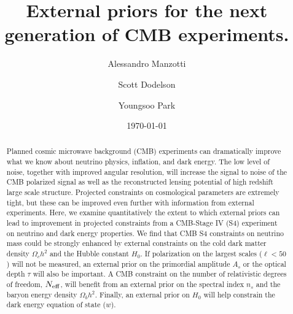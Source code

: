\documentclass[aps,prd,reprint,superscriptaddress]{revtex4-1}
\begin{document}
\graphicspath{{images/}}

\title{External priors for the next generation of CMB experiments.}
\author{Alessandro Manzotti}
\author{Scott Dodelson}


\author{Youngsoo Park}


\date{\today}
\begin{abstract}
Planned cosmic microwave background (CMB) experiments can dramatically improve what we know about neutrino physics, inflation, and dark energy. 
The low level of noise, together with improved angular resolution, will increase the signal to noise of the CMB polarized signal as well as the reconstructed lensing potential of high redshift large scale structure. Projected constraints on cosmological parameters are extremely tight, but these can be improved even further with information from external experiments. Here, we examine quantitatively the extent to which external priors can lead to improvement in projected constraints from a CMB-Stage IV (S4) experiment on neutrino and dark energy properties.
We find that CMB S4 constraints on neutrino mass could be strongly enhanced by external constraints on the cold dark matter density $\Omega_{c}h^{2}$ and the Hubble constant $H_{0}$. If polarization on the largest scales ($\ell<50$) will not be measured, an external prior on the primordial amplitude $A_{s}$ or the optical depth $\tau$ will also be important. A CMB constraint on the number of relativistic degrees of freedom, $N_{\rm eff}$, will benefit from an external prior on the spectral index $n_{s}$ and the baryon energy density $\Omega_{b}h^{2}$. Finally, an external prior on $H_{0}$ will help constrain the dark energy equation of state ($w$).
\end{abstract}

\pacs{}
\maketitle
\end{document}
